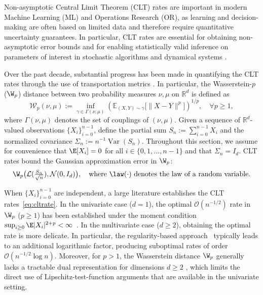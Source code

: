 \documentclass[mnsc,nonblindrev]{informs3}
\begin{document}
Non-asymptotic Central Limit Theorem (CLT) rates  are important in modern Machine Learning (ML)  and Operations Research (OR), as learning and decision-making are often based on limited data and therefore require quantitative uncertainty guarantees. In particular, CLT rates are essential for obtaining non-asymptotic
error bounds and for enabling statistically valid inference on parameters of
interest in stochastic algorithms and dynamical systems
\citep{hastings1970monte,chen2018gaussian,srikant2024rates,samsonov2024gaussian,wu2025uncertainty,chernozhukov2013gaussian}.


Over the past decade, substantial progress has been made in quantifying the CLT rates through the use of transportation metrics \citep{rio2009upper,gallouet2018regularity,raivc2018multivariate, bonis2020stein, srikant2024rates}. In particular, the Wasserstein-$p$ ($\W_p$) distance \citep{villani2008optimal} between two probability measures $\nu,\mu$ on $\mathbb{R}^d$  is defined as
\begin{equation}\label{eq:wp}
  \mathcal{W}_p(\nu,\mu)
  := \inf_{\gamma\in\Gamma(\nu,\mu)}
  \left( \mathbb{E}_{(X,Y)\sim \gamma}\bigl[\|X-Y\|^p\bigr] \right)^{1/p},\quad \forall p \geq 1,
\end{equation}
where $\Gamma(\nu,\mu)$ denotes the set of couplings of $(\nu,\mu)$. Given a sequence of $\mathbb{R}^d$-valued observations $\{X_i\}_{i=0}^{n-1}$, define the partial sum
$S_n:=\sum_{i=0}^{n-1}X_i$ and the  normalized covariance $\Sigma_n:= n^{-1}\operatorname{Var}(S_n)$. Throughout this section, we assume for convenience that $\E[X_i]=0$ for all $i\in\{0,1,\dots,n-1\}$ and that $\Sigma_n = I_d$.
 CLT rates bound the Gaussian approximation error in $\W_p$:
\begin{equation}\label{eq:cltrate}
  \W_p\big(\mathcal L(\tfrac{S_n}{\sqrt n}), \mathcal N(0,I_d)\big),\quad \text{where } \law(\cdot)\text{ denotes the law of a random variable.}
\end{equation}

When $\{X_i\}_{i=0}^{n-1}$ are independent, a large literature establishes the
 CLT rates~\eqref{eq:cltrate}. In the univariate case ($d=1$), the optimal $\mathcal{O}(n^{-1/2})$ rate in $\W_p$ ($p\ge 1$) has been established under the moment condition $\sup_{i\ge 0}\E|X_i|^{2+p}<\infty$~\citep{petrov2012sums,rio2009upper,bobkov2013entropic}.
In the multivariate case ($d\ge 2$), obtaining the optimal rate is more delicate. In particular,
the regularity-based approach~\citep{gallouet2018regularity} typically leads to an
additional logarithmic factor, producing suboptimal rates of order $\mathcal{O}(n^{-1/2}\log n)$.
Moreover, for $p> 1$, the Wasserstein distance $\W_p$ generally lacks a tractable
dual representation for dimensions $d\ge 2$ \citep{bobkov2024fourier}, which limits the direct use of
Lipschitz-test-function arguments that are available in the univariate setting.
\end{document}
